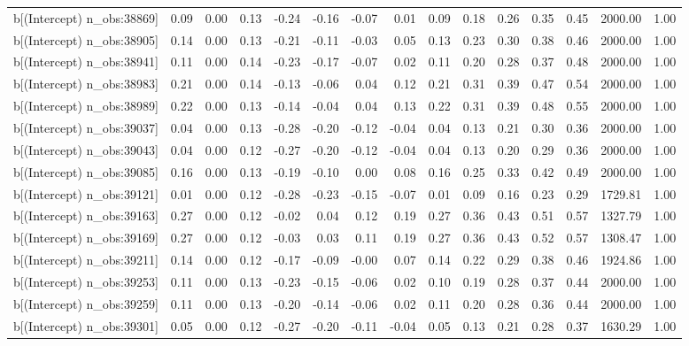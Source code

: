 \begin{table}[ht]
\begin{tabular}{rrrrrrrrrrrrrrr}
  b[(Intercept) n\_obs:38869] & 0.09 & 0.00 & 0.13 & -0.24 & -0.16 & -0.07 & 0.01 & 0.09 & 0.18 & 0.26 & 0.35 & 0.45 & 2000.00 & 1.00 \\ 
  b[(Intercept) n\_obs:38905] & 0.14 & 0.00 & 0.13 & -0.21 & -0.11 & -0.03 & 0.05 & 0.13 & 0.23 & 0.30 & 0.38 & 0.46 & 2000.00 & 1.00 \\ 
  b[(Intercept) n\_obs:38941] & 0.11 & 0.00 & 0.14 & -0.23 & -0.17 & -0.07 & 0.02 & 0.11 & 0.20 & 0.28 & 0.37 & 0.48 & 2000.00 & 1.00 \\ 
  b[(Intercept) n\_obs:38983] & 0.21 & 0.00 & 0.14 & -0.13 & -0.06 & 0.04 & 0.12 & 0.21 & 0.31 & 0.39 & 0.47 & 0.54 & 2000.00 & 1.00 \\ 
  b[(Intercept) n\_obs:38989] & 0.22 & 0.00 & 0.13 & -0.14 & -0.04 & 0.04 & 0.13 & 0.22 & 0.31 & 0.39 & 0.48 & 0.55 & 2000.00 & 1.00 \\ 
  b[(Intercept) n\_obs:39037] & 0.04 & 0.00 & 0.13 & -0.28 & -0.20 & -0.12 & -0.04 & 0.04 & 0.13 & 0.21 & 0.30 & 0.36 & 2000.00 & 1.00 \\ 
  b[(Intercept) n\_obs:39043] & 0.04 & 0.00 & 0.12 & -0.27 & -0.20 & -0.12 & -0.04 & 0.04 & 0.13 & 0.20 & 0.29 & 0.36 & 2000.00 & 1.00 \\ 
  b[(Intercept) n\_obs:39085] & 0.16 & 0.00 & 0.13 & -0.19 & -0.10 & 0.00 & 0.08 & 0.16 & 0.25 & 0.33 & 0.42 & 0.49 & 2000.00 & 1.00 \\ 
  b[(Intercept) n\_obs:39121] & 0.01 & 0.00 & 0.12 & -0.28 & -0.23 & -0.15 & -0.07 & 0.01 & 0.09 & 0.16 & 0.23 & 0.29 & 1729.81 & 1.00 \\ 
  b[(Intercept) n\_obs:39163] & 0.27 & 0.00 & 0.12 & -0.02 & 0.04 & 0.12 & 0.19 & 0.27 & 0.36 & 0.43 & 0.51 & 0.57 & 1327.79 & 1.00 \\ 
  b[(Intercept) n\_obs:39169] & 0.27 & 0.00 & 0.12 & -0.03 & 0.03 & 0.11 & 0.19 & 0.27 & 0.36 & 0.43 & 0.52 & 0.57 & 1308.47 & 1.00 \\ 
  b[(Intercept) n\_obs:39211] & 0.14 & 0.00 & 0.12 & -0.17 & -0.09 & -0.00 & 0.07 & 0.14 & 0.22 & 0.29 & 0.38 & 0.46 & 1924.86 & 1.00 \\ 
  b[(Intercept) n\_obs:39253] & 0.11 & 0.00 & 0.13 & -0.23 & -0.15 & -0.06 & 0.02 & 0.10 & 0.19 & 0.28 & 0.37 & 0.44 & 2000.00 & 1.00 \\ 
  b[(Intercept) n\_obs:39259] & 0.11 & 0.00 & 0.13 & -0.20 & -0.14 & -0.06 & 0.02 & 0.11 & 0.20 & 0.28 & 0.36 & 0.44 & 2000.00 & 1.00 \\ 
  b[(Intercept) n\_obs:39301] & 0.05 & 0.00 & 0.12 & -0.27 & -0.20 & -0.11 & -0.04 & 0.05 & 0.13 & 0.21 & 0.28 & 0.37 & 1630.29 & 1.00 \\ 

\end{tabular}
\end{table}
